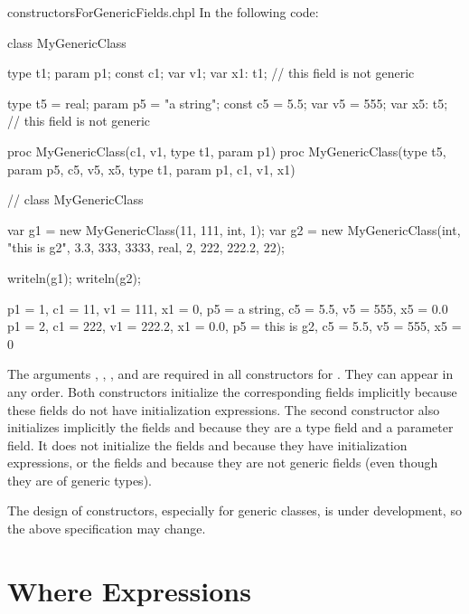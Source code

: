 \begin{chapelexample}{constructorsForGenericFields.chpl}
In the following code:
\begin{chapel}
class MyGenericClass {
  type t1;
  param p1;
  const c1;
  var v1;
  var x1: t1; // this field is not generic

  type t5 = real;
  param p5 = "a string";
  const c5 = 5.5;
  var v5 = 555;
  var x5: t5; // this field is not generic

  proc MyGenericClass(c1, v1, type t1, param p1) { }
  proc MyGenericClass(type t5, param p5, c5, v5, x5,
                     type t1, param p1, c1, v1, x1) { }
}  // class MyGenericClass

var g1 = new MyGenericClass(11, 111, int, 1);
var g2 = new MyGenericClass(int, "this is g2", 3.3, 333, 3333,
                            real, 2, 222, 222.2, 22);
\end{chapel}
\begin{chapelpost}
writeln(g1);
writeln(g2);
\end{chapelpost}
\begin{chapeloutput}
{p1 = 1, c1 = 11, v1 = 111, x1 = 0, p5 = a string, c5 = 5.5, v5 = 555, x5 = 0.0}
{p1 = 2, c1 = 222, v1 = 222.2, x1 = 0.0, p5 = this is g2, c5 = 5.5, v5 = 555, x5 = 0}
\end{chapeloutput}
The arguments , , , and  are
required in all constructors for . They can appear
in any order. Both  constructors initialize the
corresponding fields implicitly because these fields do not have initialization
expressions. The second constructor also initializes implicitly
the fields  and  because they are a type field
and a parameter field. It does not initialize the fields 
and  because they have initialization expressions, or
the fields  and  because they are not generic fields
(even though they are of generic types).
\end{chapelexample}

\begin{openissue}
The design of constructors, especially for generic classes, is
under development, so the above specification may change.
\end{openissue}

\section{Where Expressions}
\label{Where_Expressions}

